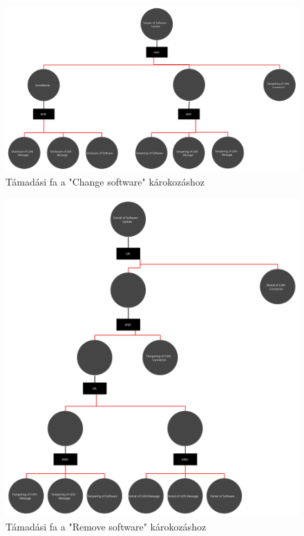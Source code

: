 \begin{figure}[!ht]
	\centering
	\includegraphics[width=120mm, keepaspectratio]{figures/AT-SECSW-01.png}
	\caption{Támadási fa a "Change software" károkozáshoz} 
	\label{fig:ff_change_sw}
\end{figure}
\begin{figure}[!ht]
	\centering
	\includegraphics[width=120mm, keepaspectratio]{figures/AT-SECSW-02.png}
	\caption{Támadási fa a "Remove software" károkozáshoz} 
	\label{fig:ff_remove_sw}
\end{figure}
